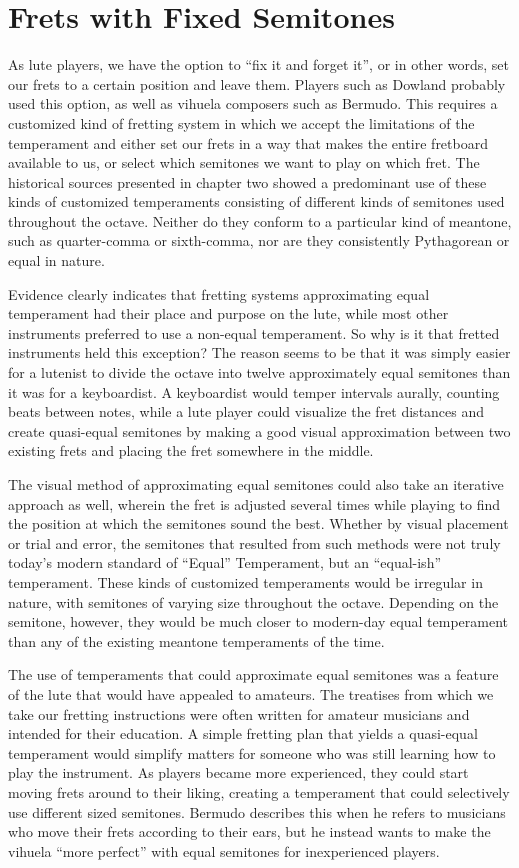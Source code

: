 \section{Frets with Fixed Semitones}

As lute players, we have the option to ``fix it and forget it'', or in other
words, set our frets to a certain position and leave them.  Players such as
Dowland probably used this option, as well as vihuela composers such as Bermudo.
This requires a customized kind of fretting system in which we accept the
limitations of the temperament and either set our frets in a way that makes the
entire fretboard available to us, or select which semitones we want to
play on which fret. The historical sources presented in chapter two showed a
predominant use of these kinds of customized temperaments consisting of
different kinds of semitones used throughout the octave. Neither do they
conform to a particular kind of meantone, such as quarter-comma or sixth-comma, nor are
they consistently Pythagorean or equal in nature.

Evidence clearly indicates that fretting systems approximating equal temperament had
their place and purpose on the lute, while most other instruments preferred to use a
non-equal temperament.  So why is it that fretted instruments held this exception? The
reason seems to be that it was simply easier for a lutenist to divide the octave into
twelve approximately equal semitones than it was for a keyboardist. A keyboardist would
temper intervals aurally, counting beats between notes, while a lute player could
visualize the fret distances and create quasi-equal semitones by making a good
visual approximation between two existing frets and placing the fret somewhere in the
middle.

The visual method of approximating equal semitones could also take an iterative approach as well,
wherein the fret is adjusted several times while playing to find the position at which the semitones
sound the best. Whether by visual placement or trial and error, the semitones that resulted from
such methods were not truly today's modern standard of ``Equal'' Temperament, but an ``equal-ish''
temperament. These kinds of customized temperaments would be irregular in nature, with semitones of
varying size throughout the octave.  Depending on the semitone, however, they would be much closer
to modern-day equal temperament than any of the existing meantone temperaments of the time.

The use of temperaments that could approximate equal semitones was a feature
of the lute that would have appealed to amateurs. The treatises from which we
take our fretting instructions were often written for amateur musicians and intended
for their education. A simple fretting plan that yields a quasi-equal temperament
would simplify matters for someone who was still learning how to play the instrument.
As players became more experienced, they could start moving frets around to their
liking, creating a temperament that could selectively use different sized
semitones. Bermudo describes this when he refers to musicians who move their
frets according to their ears, but he instead wants to make the vihuela ``more
perfect'' with equal semitones for inexperienced players.\autocite[78]{DE:1}

